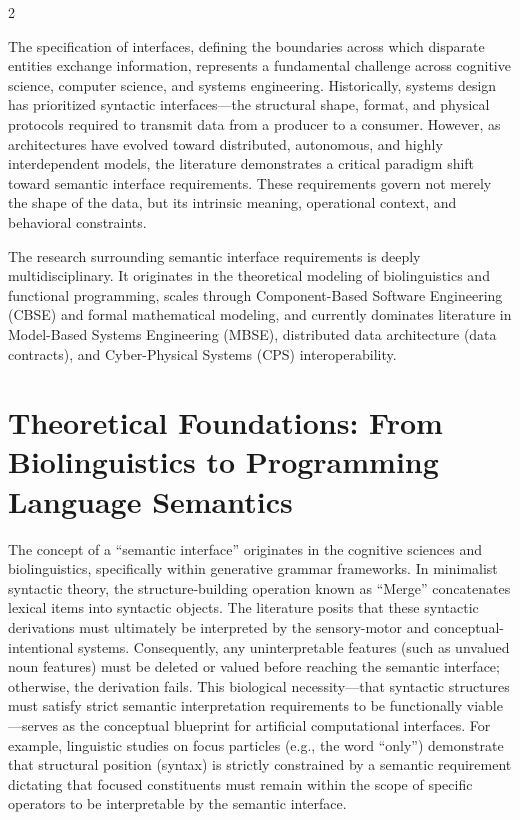 \documentclass[11pt,letterpaper]{article}
\begin{document}
\begin{multicols*}{2}

The specification of interfaces, defining the boundaries across which disparate entities exchange information, represents a fundamental challenge across cognitive science, computer science, and systems engineering. Historically, systems design has prioritized syntactic interfaces—the structural shape, format, and physical protocols required to transmit data from a producer to a consumer. However, as architectures have evolved toward distributed, autonomous, and highly interdependent models, the literature demonstrates a critical paradigm shift toward semantic interface requirements. These requirements govern not merely the shape of the data, but its intrinsic meaning, operational context, and behavioral constraints.

The research surrounding semantic interface requirements is deeply multidisciplinary. It originates in the theoretical modeling of biolinguistics and functional programming, scales through Component-Based Software Engineering (CBSE) and formal mathematical modeling, and currently dominates literature in Model-Based Systems Engineering (MBSE), distributed data architecture (data contracts), and Cyber-Physical Systems (CPS) interoperability.

\section{Theoretical Foundations: From Biolinguistics to Programming Language Semantics}
The concept of a ``semantic interface'' originates in the cognitive sciences and biolinguistics, specifically within generative grammar frameworks. In minimalist syntactic theory, the structure-building operation known as ``Merge'' concatenates lexical items into syntactic objects. The literature posits that these syntactic derivations must ultimately be interpreted by the sensory-motor and conceptual-intentional systems. Consequently, any uninterpretable features (such as unvalued noun features) must be deleted or valued before reaching the semantic interface; otherwise, the derivation fails. This biological necessity—that syntactic structures must satisfy strict semantic interpretation requirements to be functionally viable—serves as the conceptual blueprint for artificial computational interfaces. For example, linguistic studies on focus particles (e.g., the word ``only'') demonstrate that structural position (syntax) is strictly constrained by a semantic requirement dictating that focused constituents must remain within the scope of specific operators to be interpretable by the semantic interface.


\end{multicols*}
\end{document}

